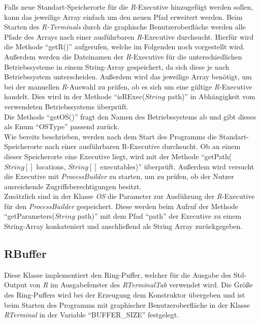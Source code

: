 \documentclass[a4paper, 12pt]{report} %
\begin{document}
Falls neue Standart-Speicherorte für die \textit{R}-Executive hinzugefügt werden sollen, kann das jeweilige Array einfach um den neuen Pfad erweitert werden. Beim Starten des \textit{R-Terminals} durch die graphische Benutzeroberfläche werden alle Pfade des Arrays nach einer ausführbaren \textit{R}-Executive durchsucht. Hierfür wird die Methode "`getR()"' aufgerufen, welche im Folgenden noch vorgestellt wird.\\

Außerdem werden die Dateinamen der \textit{R}-Executive für die unterschiedlichen Betriebssysteme in einem String-Array gespeichert, da sich diese je nach Betriebssystem unterscheiden. Außerdem wird das jeweilige Array benötigt, um bei der manuellen \textit{R}-Auswahl zu prüfen, ob es sich um eine gültige \textit{R}-Executive handelt. Dies wird in der Methode "`isRExec($String$ path)"' in Abhängigkeit vom verwendeten Betriebssystems überprüft.\\

Die Methode "`getOS()"' fragt den Namen des Betriebssystems ab und gibt dieses als Enum "`OSType"' passend zurück.\\

Wie bereits beschrieben, werden nach dem Start des Programms die Standart-Speicherorte nach einer ausführbaren R-Executive durchsucht. Ob an einem dieser Speicherorte eine Executive liegt, wird mit der Methode "`getPath($String[]$ locations, $String[]$ executables)"' überprüft. Außerdem wird versucht die Executive mit \textit{ProcessBuilder} zu starten, um zu prüfen, ob der Nutzer ausreichende Zugriffsberechtigungen besitzt.\\

Zusätzlich sind in der Klasse \textit{OS} die Parameter zur Ausführung der \textit{R}-Executive für den \textit{ProcessBuilder} gespeichert. Diese werden beim Aufruf der Methode "`getParameters($String$ path)"' mit dem Pfad "`path"' der Executive zu einem String-Array konkateniert und anschließend als String Array zurückgegeben.

\subsection{RBuffer} \label{RBuffer}

Diese Klasse implementiert den Ring-Puffer, welcher für die Ausgabe des Std-Output von \textit{R} im Ausgabefenster des \textit{RTerminalTab} verwendet wird.
Die Größe des Ring-Puffers wird bei der Erzeugung dem Konstruktor übergeben und ist beim Starten des Programms mit graphischer Benutzeroberfläche in der Klasse \textit{RTerminal} in der Variable "`BUFFER\_SIZE"' festgelegt.
\end{document}
